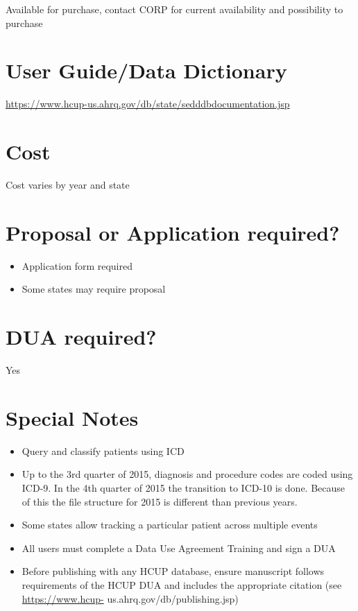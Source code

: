 \documentclass[
]{book}
\providecommand{\tightlist}{%
  \setlength{\itemsep}{0pt}\setlength{\parskip}{0pt}}
\begin{document}
Available for purchase, contact CORP for current availability and possibility to purchase

\hypertarget{user-guidedata-dictionary-84}{%
\section{User Guide/Data Dictionary}\label{user-guidedata-dictionary-84}}

\url{https://www.hcup-us.ahrq.gov/db/state/sedddbdocumentation.jsp}

\hypertarget{cost-84}{%
\section{Cost}\label{cost-84}}

Cost varies by year and state

\hypertarget{proposal-or-application-required-84}{%
\section{Proposal or Application required?}\label{proposal-or-application-required-84}}

\begin{itemize}
\tightlist
\item
  Application form required
\item
  Some states may require proposal
\end{itemize}

\hypertarget{dua-required-84}{%
\section{DUA required?}\label{dua-required-84}}

Yes

\hypertarget{special-notes-84}{%
\section{Special Notes}\label{special-notes-84}}

\begin{itemize}
\tightlist
\item
  Query and classify patients using ICD
\item
  Up to the 3rd quarter of 2015, diagnosis and procedure codes are coded using ICD-9. In the 4th quarter of 2015 the transition to ICD-10 is done. Because of this the file structure for 2015 is different than previous years.
\item
  Some states allow tracking a particular patient across multiple events
\item
  All users must complete a Data Use Agreement Training and sign a DUA
\item
  Before publishing with any HCUP database, ensure manuscript follows requirements of the HCUP DUA and includes the appropriate citation (see \url{https://www.hcup-} us.ahrq.gov/db/publishing.jsp)
\end{itemize}
\end{document}
